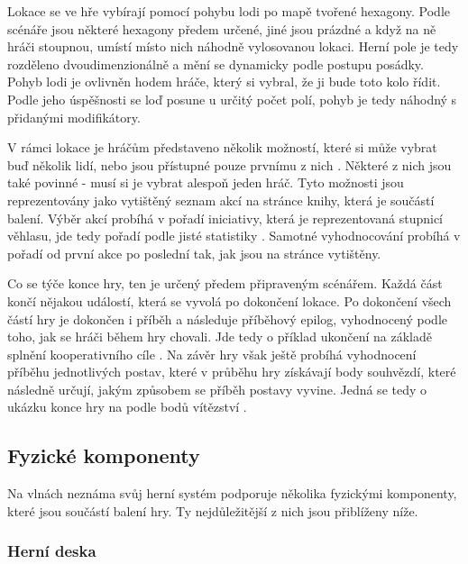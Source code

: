 Lokace se ve hře vybírají pomocí pohybu lodi po mapě tvořené hexagony. Podle scénáře jsou některé hexagony předem určené, jiné jsou prázdné a když na ně hráči stoupnou, umístí místo nich náhodně vylosovanou lokaci. Herní pole je tedy rozděleno dvoudimenzionálně a mění se dynamicky  podle postupu posádky. Pohyb lodi je ovlivněn hodem hráče, který si vybral, že ji bude toto kolo řídit. Podle jeho úspěšnosti se loď posune u určitý počet polí, pohyb je tedy náhodný  s přidanými modifikátory.

V rámci lokace je hráčům představeno několik možností, které si může vybrat buď několik lidí, nebo jsou přístupné pouze prvnímu z nich . Některé z nich jsou také povinné - musí si je vybrat alespoň jeden hráč. Tyto možnosti jsou reprezentovány jako vytištěný seznam akcí na stránce knihy, která je součástí balení. Výběr akcí probíhá v pořadí iniciativy, která je reprezentovaná stupnicí věhlasu, jde tedy pořadí podle jisté statistiky . Samotné vyhodnocování probíhá v pořadí od první akce po poslední tak, jak jsou na stránce vytištěny.

Co se týče konce hry, ten je určený předem připraveným scénářem. Každá část končí nějakou událostí, která se vyvolá po dokončení lokace. Po dokončení všech částí hry je dokončen i příběh a následuje příběhový epilog, vyhodnocený podle toho, jak se hráči během hry chovali. Jde tedy o příklad ukončení na základě splnění kooperativního cíle . Na závěr hry však ještě probíhá vyhodnocení příběhu jednotlivých postav, které v průběhu hry získávají body souhvězdí, které následně určují, jakým způsobem se příběh postavy vyvine. Jedná se tedy o ukázku konce hry na podle bodů vítězství .


\subsection{Fyzické komponenty}
\label{subsec:fw_components}

Na vlnách neznáma svůj herní systém podporuje několika fyzickými komponenty, které jsou součástí balení hry. Ty nejdůležitější z nich jsou přiblíženy níže.

\subsubsection*{Herní deska}
\label{subsubsec:fw_comp_board_and_book}

